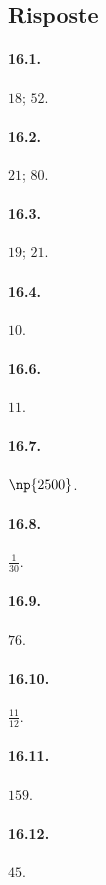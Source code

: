 \subsection{Risposte}
\begin{multicols}{2}
\paragraph{16.1.}
$18$; $52$.

\paragraph{16.2.}
$21$; $80$.

\paragraph{16.3.}
$19$; $21$.

\paragraph{16.4.}
$10$.

\paragraph{16.6.}
$11$.

\paragraph{16.7.}
$\np{2500}$.

\paragraph{16.8.}
$\frac{1}{30}$.

\paragraph{16.9.}
$76$.

\paragraph{16.10.}
$\frac{11}{12}$.

\paragraph{16.11.}
$159$.

\paragraph{16.12.}
$45$.


\end{multicols}
